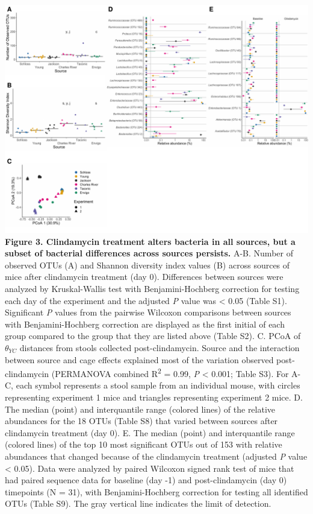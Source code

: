 \documentclass[
  11pt,
]{article}
\begin{document}
\includegraphics{figure_3.pdf} \textbf{Figure 3. Clindamycin treatment
alters bacteria in all sources, but a subset of bacterial differences
across sources persists.} A-B. Number of observed OTUs (A) and Shannon
diversity index values (B) across sources of mice after clindamycin
treatment (day 0). Differences between sources were analyzed by
Kruskal-Wallis test with Benjamini-Hochberg correction for testing each
day of the experiment and the adjusted \emph{P} value was \textless{}
0.05 (Table S1). Significant \emph{P} values from the pairwise Wilcoxon
comparisons between sources with Benjamini-Hochberg correction are
displayed as the first initial of each group compared to the group that
they are listed above (Table S2). C. PCoA of \(\theta_{YC}\) distances
from stools collected post-clindamycin. Source and the interaction
between source and cage effects explained most of the variation observed
post-clindamycin (PERMANOVA combined R\textsuperscript{2} = 0.99,
\emph{P} \textless{} 0.001; Table S3). For A-C, each symbol represents a
stool sample from an individual mouse, with circles representing
experiment 1 mice and triangles representing experiment 2 mice. D. The
median (point) and interquantile range (colored lines) of the relative
abundances for the 18 OTUs (Table S8) that varied between sources after
clindamycin treatment (day 0). E. The median (point) and interquantile
range (colored lines) of the top 10 most significant OTUs out of 153
with relative abundances that changed because of the clindamycin
treatment (adjusted \emph{P} value \textless{} 0.05). Data were analyzed
by paired Wilcoxon signed rank test of mice that had paired sequence
data for baseline (day -1) and post-clindamycin (day 0) timepoints (N =
31), with Benjamini-Hochberg correction for testing all identified OTUs
(Table S9). The gray vertical line indicates the limit of detection.
\end{document}

